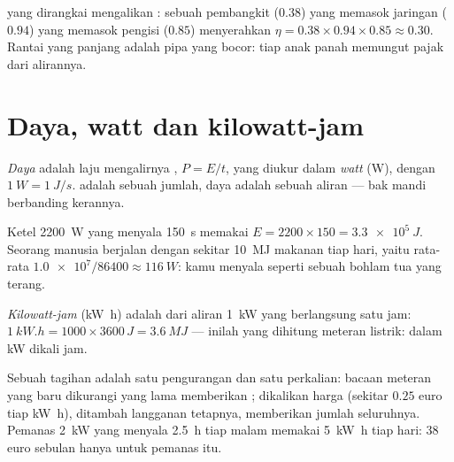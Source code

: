 \begin{remark}\label{rem:g10:energy-conservation:chain-eta}
 yang dirangkai mengalikan : sebuah pembangkit
($0.38$) yang memasok jaringan ($0.94$) yang memasok pengisi 
($0.85$) menyerahkan $\eta = 0.38 \times 0.94 \times 0.85 \approx 0.30$. Rantai yang panjang adalah pipa yang bocor: tiap anak panah
memungut pajak dari alirannya.
\end{remark}

\section{Daya, watt dan kilowatt-jam}

\begin{definition}[Daya]\label{def:g10:energy-conservation:power}
\emph{Daya} adalah laju mengalirnya , $P = E/t$, yang
diukur dalam \emph{watt} (\unit{W}), dengan
$\qty{1}{W} = \qty{1}{J/s}$.  adalah sebuah jumlah, daya adalah
sebuah aliran --- bak mandi berbanding kerannya.
\end{definition}

\begin{example}\label{ex:g10:energy-conservation:power}
Ketel \qty{2200}{W} yang menyala \qty{150}{s} memakai
$E = 2200 \times 150 = \qty{3.3e5}{J}$. Seorang manusia berjalan dengan
sekitar \qty{10}{MJ} makanan tiap hari, yaitu rata-rata
$\num{1.0e7}/\num{86400} \approx \qty{116}{W}$: kamu menyala seperti
sebuah bohlam tua yang terang.
\end{example}

\begin{definition}\label{def:g10:energy-conservation:kwh}
\emph{Kilowatt-jam} (\unit{kW.h}) adalah 
dari aliran \qty{1}{kW} yang berlangsung satu jam:
$\qty{1}{kW.h} = 1000 \times 3600\,\unit{J} = \qty{3.6}{MJ}$ --- inilah
 yang dihitung meteran listrik:  dalam \unit{kW} dikali jam.
\end{definition}

\begin{example}\label{ex:g10:energy-conservation:bill}
Sebuah tagihan adalah satu pengurangan dan satu perkalian: bacaan
meteran yang baru dikurangi yang lama memberikan ;
dikalikan harga  (sekitar $0.25$ euro tiap \unit{kW.h}),
ditambah langganan tetapnya, memberikan jumlah seluruhnya. Pemanas
\qty{2}{kW} yang menyala \qty{2.5}{h} tiap malam memakai \qty{5}{kW.h}
tiap hari: $38$ euro sebulan hanya untuk pemanas itu.
\end{example}

